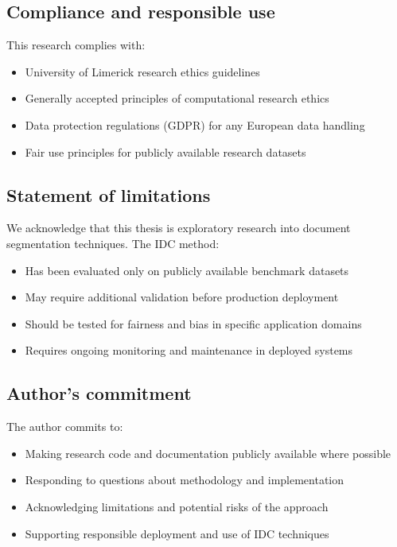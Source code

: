 \documentclass[12pt,a4paper]{report}
\begin{document}
\subsection{Compliance and responsible use}

This research complies with:
\begin{itemize}
\item University of Limerick research ethics guidelines
\item Generally accepted principles of computational research ethics
\item Data protection regulations (GDPR) for any European data handling
\item Fair use principles for publicly available research datasets
\end{itemize}

\subsection{Statement of limitations}

We acknowledge that this thesis is exploratory research into document segmentation techniques. The IDC method:
\begin{itemize}
\item Has been evaluated only on publicly available benchmark datasets
\item May require additional validation before production deployment
\item Should be tested for fairness and bias in specific application domains
\item Requires ongoing monitoring and maintenance in deployed systems
\end{itemize}

\subsection{Author's commitment}

The author commits to:
\begin{itemize}
\item Making research code and documentation publicly available where possible
\item Responding to questions about methodology and implementation
\item Acknowledging limitations and potential risks of the approach
\item Supporting responsible deployment and use of IDC techniques
\end{itemize}
\end{document}
